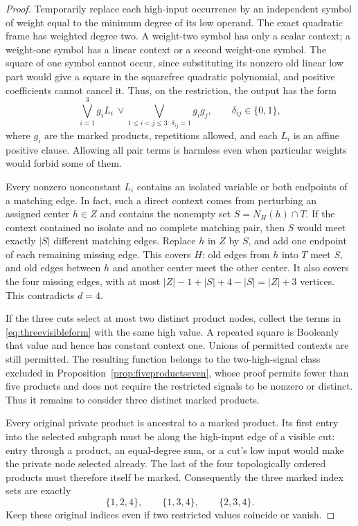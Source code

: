 \begin{proof}
Temporarily replace each high-input occurrence by an independent symbol of weight equal to the minimum degree of its low operand. The exact quadratic frame has weighted degree two. A weight-two symbol has only a scalar context; a weight-one symbol has a linear context or a second weight-one symbol. The square of one symbol cannot occur, since substituting its nonzero old linear low part would give a square in the squarefree quadratic polynomial, and positive coefficients cannot cancel it. Thus, on the restriction, the output has the form
\begin{equation}\label{eq:threevisibleform}
 \bigvee_{i=1}^3 g_iL_i\ \vee\!
 \bigvee_{1\leq i<j\leq3:\,\delta_{ij}=1}g_ig_j,
 \qquad \delta_{ij}\in\{0,1\},
\end{equation}
where $g_i$ are the marked products, repetitions allowed, and each $L_i$ is an affine positive clause. Allowing all pair terms is harmless even when particular weights would forbid some of them.

Every nonzero nonconstant $L_i$ contains an isolated variable or both endpoints of a matching edge. In fact, such a direct context comes from perturbing an assigned center $h\in Z$ and contains the nonempty set $S=N_H(h)\cap T$. If the context contained no isolate and no complete matching pair, then $S$ would meet exactly $|S|$ different matching edges. Replace $h$ in $Z$ by $S$, and add one endpoint of each remaining missing edge. This covers $H$: old edges from $h$ into $T$ meet $S$, and old edges between $h$ and another center meet the other center. It also covers the four missing edges, with at most $|Z|-1+|S|+4-|S|=|Z|+3$ vertices. This contradicts $d=4$.

If the three cuts select at most two distinct product nodes, collect the terms in \eqref{eq:threevisibleform} with the same high value. A repeated square is Booleanly that value and hence has constant context one. Unions of permitted contexts are still permitted. The resulting function belongs to the two-high-signal class excluded in Proposition~\ref{prop:fiveproductseven}, whose proof permits fewer than five products and does not require the restricted signals to be nonzero or distinct. Thus it remains to consider three distinct marked products.

Every original private product is ancestral to a marked product. Its first entry into the selected subgraph must be along the high-input edge of a visible cut: entry through a product, an equal-degree sum, or a cut's low input would make the private node selected already. The last of the four topologically ordered products must therefore itself be marked. Consequently the three marked index sets are exactly
\[
 \{1,2,4\},\qquad \{1,3,4\},\qquad \{2,3,4\}.
\]
Keep these original indices even if two restricted values coincide or vanish.


\end{proof}
